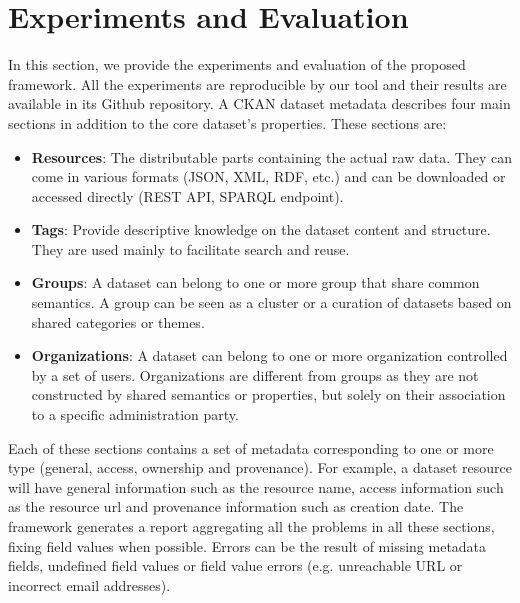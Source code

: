 \documentclass[runningheads,a4paper]{../../Util/LaTEX/llncs}
\begin{document}

\section{Experiments and Evaluation}
\label{sec:experiment}
In this section, we provide the experiments and evaluation of the proposed framework. All the experiments are reproducible by our tool and their results are available in its Github repository. A CKAN dataset metadata describes four main sections in addition to the core dataset's properties. These sections are:
\begin{itemize}
  \item \textbf{Resources}: The distributable parts containing the actual raw data. They can come in various formats (JSON, XML, RDF, etc.) and can be downloaded or accessed directly (REST API, SPARQL endpoint).
  \item \textbf{Tags}: Provide descriptive knowledge on the dataset content and structure. They are used mainly to facilitate search and reuse.
  \item \textbf{Groups}: A dataset can belong to one or more group that share common semantics. A group can be seen as a cluster or a curation of datasets based on shared categories or themes.
  \item \textbf{Organizations}: A dataset can belong to one or more organization controlled by a set of users. Organizations are different from groups as they are not constructed by shared semantics or properties, but solely on their association to a specific administration party.
\end{itemize}

Each of these sections contains a set of metadata corresponding to one or more type (general, access, ownership and provenance). For example, a dataset resource will have general information such as the resource name, access information such as the resource url and provenance information such as creation date. The framework generates a report aggregating all the problems in all these sections, fixing field values when possible. Errors can be the result of missing metadata fields, undefined field values or field value errors (e.g. unreachable URL or incorrect email addresses).
\end{document}
